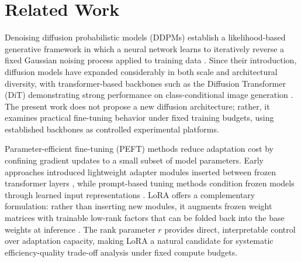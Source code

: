 \documentclass[pdflatex,sn-mathphys-num]{Springer_format/sn-jnl}
\begin{document}
  \section{Related Work}
  \label{sec:related}
  
  Denoising diffusion probabilistic models (DDPMs) establish a likelihood-based generative
  framework in which a neural network learns to iteratively reverse a fixed Gaussian noising
  process applied to training data \cite{ho2020ddpm}. Since their introduction, diffusion
  models have expanded considerably in both scale and architectural diversity, with
  transformer-based backbones such as the Diffusion Transformer (DiT) demonstrating strong
  performance on class-conditional image generation \cite{peebles2023dit}. The present work
  does not propose a new diffusion architecture; rather, it examines practical fine-tuning
  behavior under fixed training budgets, using established backbones as controlled
  experimental platforms.
  
  Parameter-efficient fine-tuning (PEFT) methods reduce adaptation cost by confining
  gradient updates to a small subset of model parameters. Early approaches introduced
  lightweight adapter modules inserted between frozen transformer layers
  \cite{houlsby2019adapters}, while prompt-based tuning methods condition frozen models
  through learned input representations \cite{lester2021prompt}. LoRA offers a complementary
  formulation: rather than inserting new modules, it augments frozen weight matrices with
  trainable low-rank factors that can be folded back into the base weights at inference
  \cite{hu2022lora}. The rank parameter $r$ provides direct, interpretable control over
  adaptation capacity, making LoRA a natural candidate for systematic efficiency-quality
  trade-off analysis under fixed compute budgets.
  
\end{document}
